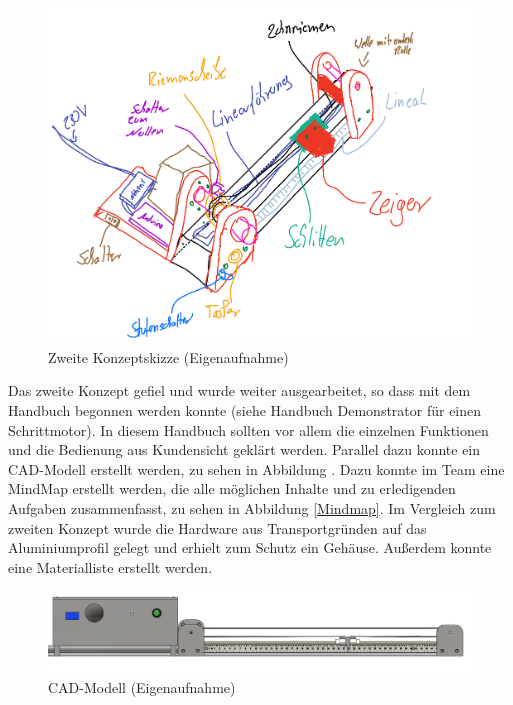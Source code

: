\begin{figure}[H]
	\begin{center}
		\includegraphics[width=\textwidth]{Images/Konzeptskizze2.png}
		\caption{Zweite Konzeptskizze (Eigenaufnahme)} \label{ZweiteKonzeptskizze}
	\end{center}
\end{figure}

Das zweite Konzept gefiel und wurde weiter ausgearbeitet, so dass mit dem Handbuch begonnen werden konnte (siehe Handbuch Demonstrator für einen Schrittmotor). In diesem Handbuch sollten vor allem die einzelnen Funktionen und die Bedienung aus Kundensicht geklärt werden. Parallel dazu konnte ein CAD-Modell erstellt werden, zu sehen in Abbildung . Dazu konnte im Team eine MindMap erstellt werden, die alle möglichen Inhalte und zu erledigenden Aufgaben zusammenfasst, zu sehen in Abbildung \ref{Mindmap}. Im Vergleich zum zweiten Konzept wurde die Hardware aus Transportgründen auf das Aluminiumprofil gelegt und erhielt zum Schutz ein Gehäuse. Außerdem konnte eine Materialliste erstellt werden.

\begin{figure}[H]
	\begin{center}
		\includegraphics[width=\textwidth]{Images/Konstruktion1.png}
		\caption{CAD-Modell (Eigenaufnahme)} \label{CADMOD}
	\end{center}
\end{figure} 

